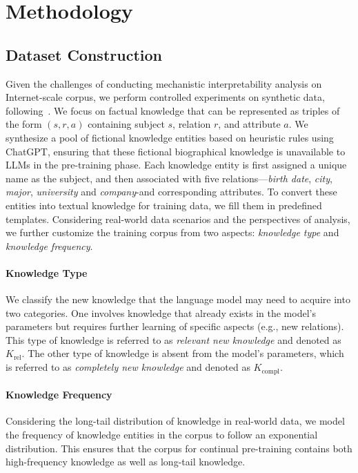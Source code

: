 \section{Methodology}

\subsection{Dataset Construction}
\label{sec:dataset}

Given the challenges of conducting mechanistic interpretability analysis on Internet-scale corpus, we perform controlled experiments on synthetic data, following~\citet{physics3.1,physics3.2,physics3.3}.
We focus on factual knowledge that can be represented as triples of the form $(s, r ,a)$ containing subject $s$, relation $r$, and attribute $a$.
We synthesize a pool of fictional knowledge entities based on heuristic rules using ChatGPT, ensuring that these fictional biographical knowledge is unavailable to LLMs in the pre-training phase.
Each knowledge entity is first assigned a unique name as the subject, and then associated with five relations—\textit{birth date}, \textit{city}, \textit{major}, \textit{university} and \textit{company}-and corresponding attributes.
To convert these entities into textual knowledge for training data, we fill them in predefined templates.
Considering real-world data scenarios and the perspectives of analysis, we further customize the training corpus from two aspects: \textit{knowledge type} and \textit{knowledge frequency}.

\paragraph{Knowledge Type}
We classify the new knowledge that the language model may need to acquire into two categories. 
One involves knowledge that already exists in the model's parameters but requires further learning of specific aspects (e.g., new relations).
This type of knowledge is referred to as \textit{relevant new knowledge} and denoted as $K_\text{rel}$.
The other type of knowledge is absent from the model's parameters, which is referred to as \textit{completely new knowledge} and denoted as $K_\text{compl}$.

\paragraph{Knowledge Frequency}
Considering the long-tail distribution of knowledge in real-world data, we model the frequency of knowledge entities in the corpus to follow an exponential distribution.
This ensures that the corpus for continual pre-training contains both high-frequency knowledge as well as long-tail knowledge.

